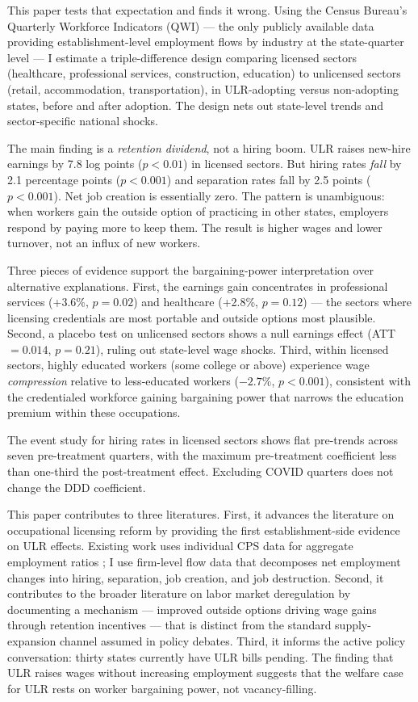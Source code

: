\documentclass[12pt]{article}
\begin{document}
This paper tests that expectation and finds it wrong. Using the Census Bureau's Quarterly Workforce Indicators (QWI) --- the only publicly available data providing establishment-level employment flows by industry at the state-quarter level --- I estimate a triple-difference design comparing licensed sectors (healthcare, professional services, construction, education) to unlicensed sectors (retail, accommodation, transportation), in ULR-adopting versus non-adopting states, before and after adoption. The design nets out state-level trends and sector-specific national shocks.

The main finding is a \emph{retention dividend}, not a hiring boom. ULR raises new-hire earnings by 7.8 log points ($p < 0.01$) in licensed sectors. But hiring rates \emph{fall} by 2.1 percentage points ($p < 0.001$) and separation rates fall by 2.5 points ($p < 0.001$). Net job creation is essentially zero. The pattern is unambiguous: when workers gain the outside option of practicing in other states, employers respond by paying more to keep them. The result is higher wages and lower turnover, not an influx of new workers.

Three pieces of evidence support the bargaining-power interpretation over alternative explanations. First, the earnings gain concentrates in professional services (+3.6\%, $p = 0.02$) and healthcare (+2.8\%, $p = 0.12$) --- the sectors where licensing credentials are most portable and outside options most plausible. Second, a placebo test on unlicensed sectors shows a null earnings effect (ATT $= 0.014$, $p = 0.21$), ruling out state-level wage shocks. Third, within licensed sectors, highly educated workers (some college or above) experience wage \emph{compression} relative to less-educated workers ($-2.7\%$, $p < 0.001$), consistent with the credentialed workforce gaining bargaining power that narrows the education premium within these occupations.

The event study for hiring rates in licensed sectors shows flat pre-trends across seven pre-treatment quarters, with the maximum pre-treatment coefficient less than one-third the post-treatment effect. Excluding COVID quarters does not change the DDD coefficient.

This paper contributes to three literatures. First, it advances the literature on occupational licensing reform \citep{KleinerKrueger2013, JohnsonKleiner2020, Blair2020} by providing the first establishment-side evidence on ULR effects. Existing work uses individual CPS data for aggregate employment ratios \citep{TimmonsBae2023}; I use firm-level flow data that decomposes net employment changes into hiring, separation, job creation, and job destruction. Second, it contributes to the broader literature on labor market deregulation by documenting a mechanism --- improved outside options driving wage gains through retention incentives --- that is distinct from the standard supply-expansion channel assumed in policy debates. Third, it informs the active policy conversation: thirty states currently have ULR bills pending. The finding that ULR raises wages without increasing employment suggests that the welfare case for ULR rests on worker bargaining power, not vacancy-filling.
\end{document}

